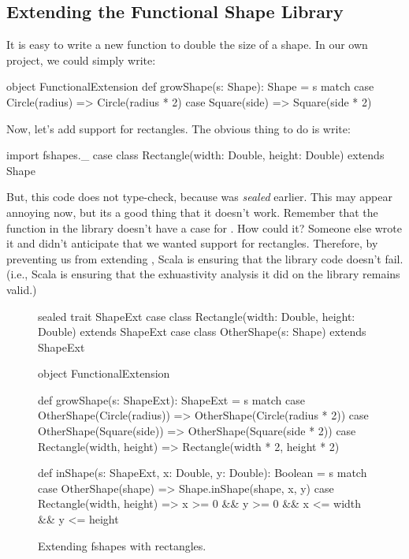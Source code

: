 \documentclass{book}
\begin{document}
\subsection{Extending the Functional Shape Library}

It is easy to write a new function to double the size of a shape. In our
own project, we could simply write:

\begin{scalacode}
object FunctionalExtension {
  def growShape(s: Shape): Shape = s match {
    case Circle(radius) => Circle(radius * 2)
    case Square(side) => Square(side * 2)
  }
}
\end{scalacode}

Now, let's add support for rectangles. The obvious thing to do is write:
\begin{scalacode}
import fshapes._
case class Rectangle(width: Double, height: Double) extends Shape
\end{scalacode}
But, this code does not type-check, because  was \emph{sealed}
earlier. This may appear annoying now, but its a good thing that it doesn't work.
Remember that the  function in the library doesn't
have a case for . How could it? Someone else wrote it
and didn't anticipate that we wanted support for rectangles. Therefore, by
preventing us from extending , Scala is ensuring that
the library code doesn't fail. (i.e., Scala is ensuring that the exhuastivity
analysis it did on the library remains valid.)

\begin{figure}
\begin{scalacode}
sealed trait ShapeExt
case class Rectangle(width: Double, height: Double) extends ShapeExt
case class OtherShape(s: Shape) extends ShapeExt

object FunctionalExtension {
  def growShape(s: ShapeExt): ShapeExt = s match {
    case OtherShape(Circle(radius)) => OtherShape(Circle(radius * 2))
    case OtherShape(Square(side)) => OtherShape(Square(side * 2))
    case Rectangle(width, height) => Rectangle(width * 2, height * 2)
  }

  def inShape(s: ShapeExt, x: Double, y: Double): Boolean = s match {
    case OtherShape(shape) => Shape.inShape(shape, x, y)
    case Rectangle(width, height) => x >= 0 && y >= 0 && x <= width && y <= height
  }
}
\end{scalacode}
\caption{Extending fshapes with rectangles.}
\label{fshapesext}
\end{figure}
\end{document}
